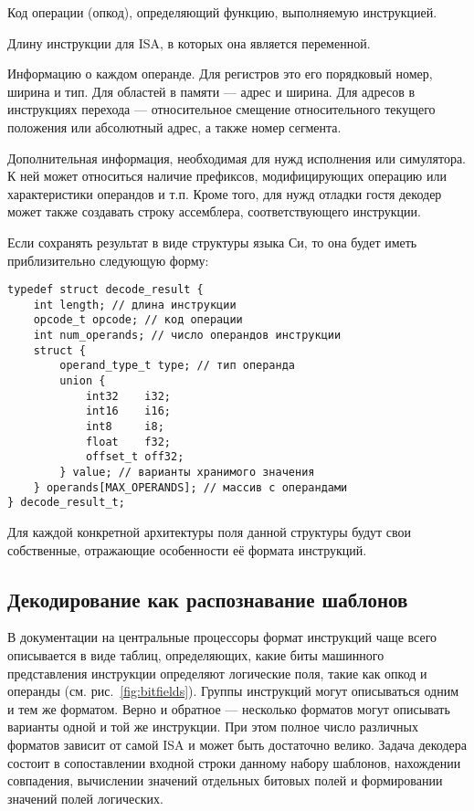 \begin{itemize*}
    \item Код операции (опкод), определяющий функцию, выполняемую инструкцией.
    \item Длину инструкции для ISA, в которых она является переменной.
    \item Информацию о каждом операнде. Для регистров это его порядковый номер, ширина и тип. Для областей в памяти --- адрес и ширина. Для адресов в инструкциях перехода --- относительное смещение относительного текущего положения или абсолютный адрес, а также номер сегмента.
    \item Дополнительная информация, необходимая для нужд исполнения или симулятора. К ней может относиться наличие префиксов, модифицирующих операцию или характеристики операндов и т.п. Кроме того, для нужд отладки гостя декодер может также создавать строку ассемблера, соответствующего инструкции.
\end{itemize*}

Если сохранять результат в виде структуры языка Си, то она будет иметь приблизительно следующую форму:

\begin{lstlisting}
typedef struct decode_result {
    int length; // длина инструкции
    opcode_t opcode; // код операции
    int num_operands; // число операндов инструкции
    struct {
        operand_type_t type; // тип операнда
        union {
            int32    i32;
            int16    i16;
            int8     i8;
            float    f32;
            offset_t off32;
        } value; // варианты хранимого значения
    } operands[MAX_OPERANDS]; // массив с операндами
} decode_result_t;
\end{lstlisting}

Для каждой конкретной архитектуры поля данной структуры будут свои собственные, отражающие особенности её формата инструкций.

\subsection{Декодирование как распознавание шаблонов}

В документации на центральные процессоры формат инструкций чаще всего описывается в виде таблиц, определяющих, какие биты машинного представления инструкции определяют логические поля, такие как опкод и операнды (см. рис.~\ref{fig:bitfields}). Группы инструкций могут описываться одним и тем же форматом. Верно и обратное --- несколько форматов могут описывать варианты одной и той же инструкции. При этом полное число различных форматов зависит от самой ISA и может быть достаточно велико. Задача декодера состоит в сопоставлении входной строки данному набору шаблонов, нахождении совпадения, вычислении значений отдельных битовых полей и формировании значений полей логических. 

